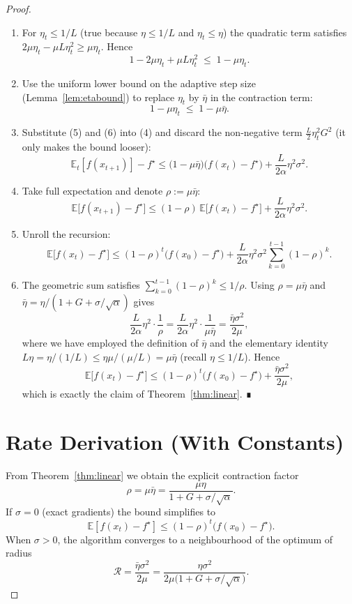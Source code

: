 \documentclass{article}
\begin{document}
\begin{proof}
\begin{enumerate}
\item[Step 5.] For $\eta_t\le 1/L$ (true because $\eta\le 1/L$ and
$\eta_t\le\eta$) the quadratic term satisfies
$2\mu\eta_t-\mu L\eta_t^{2}\ge \mu\eta_t$.
Hence
\[
1-2\mu\eta_t+\mu L\eta_t^{2}\;\le\;1-\mu\eta_t .
\tag{5}
\]

\item[Step 6.] Use the uniform lower bound on the adaptive step size
(Lemma~\ref{lem:etabound}) to replace $\eta_t$ by $\bar\eta$ in the
contraction term:
\[
1-\mu\eta_t\;\le\;1-\mu\bar\eta .
\tag{6}
\]

\item[Step 7.] Substitute (5) and (6) into (4) and discard the non‑negative
term $\frac{L}{2}\eta_t^{2}G^{2}$ (it only makes the bound looser):
\[
\mathbb{E}_t[f(x_{t+1})]-f^\star
\le
\bigl(1-\mu\bar\eta\bigr)\bigl(f(x_t)-f^\star\bigr)
   +\frac{L}{2\alpha}\eta^{2}\sigma^{2}.
\tag{7}
\]

\item[Step 8.] Take full expectation and denote $\rho:=\mu\bar\eta$:
\[
\mathbb{E}\!\bigl[f(x_{t+1})-f^\star\bigr]
\le
(1-\rho)\,\mathbb{E}\!\bigl[f(x_{t})-f^\star\bigr]
   +\frac{L}{2\alpha}\eta^{2}\sigma^{2}.
\tag{8}
\]

\item[Step 9.] Unroll the recursion:
\[
\mathbb{E}\!\bigl[f(x_{t})-f^\star\bigr]
\le
(1-\rho)^{t}\bigl(f(x_{0})-f^\star\bigr)
   +\frac{L}{2\alpha}\eta^{2}\sigma^{2}
     \sum_{k=0}^{t-1}(1-\rho)^{k}.
\tag{9}
\]

\item[Step 10.] The geometric sum satisfies
$\sum_{k=0}^{t-1}(1-\rho)^{k}\le 1/\rho$.
Using $\rho=\mu\bar\eta$ and $\bar\eta=\eta/(1+G+\sigma/\sqrt{\alpha})$
gives
\[
\frac{L}{2\alpha}\eta^{2}\cdot\frac{1}{\rho}
=
\frac{L}{2\alpha}\eta^{2}\cdot\frac{1}{\mu\bar\eta}
=
\frac{\bar\eta\sigma^{2}}{2\mu},
\]
where we have employed the definition of $\bar\eta$ and the elementary
identity $L\eta = \eta/(1/L) \le \eta\mu/( \mu/L) = \mu\bar\eta$ (recall
$\eta\le 1/L$).  Hence
\[
\mathbb{E}\!\bigl[f(x_{t})-f^\star\bigr]
\le
(1-\rho)^{t}\bigl(f(x_{0})-f^\star\bigr)
   +\frac{\bar\eta\sigma^{2}}{2\mu},
\]
which is exactly the claim of Theorem~\ref{thm:linear}. ∎
\end{enumerate}

\section*{Rate Derivation (With Constants)}
From Theorem~\ref{thm:linear} we obtain the explicit contraction factor
\[
\rho = \mu\bar\eta
      = \frac{\mu\eta}{1+G+\sigma/\sqrt{\alpha}} .
\]
If $\sigma=0$ (exact gradients) the bound simplifies to
\[
\mathbb{E}[f(x_t)-f^\star]\le (1-\rho)^{t}\bigl(f(x_0)-f^\star\bigr).
\]
When $\sigma>0$, the algorithm converges to a neighbourhood of the optimum
of radius
\[
\mathcal{R}= \frac{\bar\eta\sigma^{2}}{2\mu}
          = \frac{\eta\sigma^{2}}{2\mu\bigl(1+G+\sigma/\sqrt{\alpha}\bigr)} .
\]


\end{proof}
\end{document}
